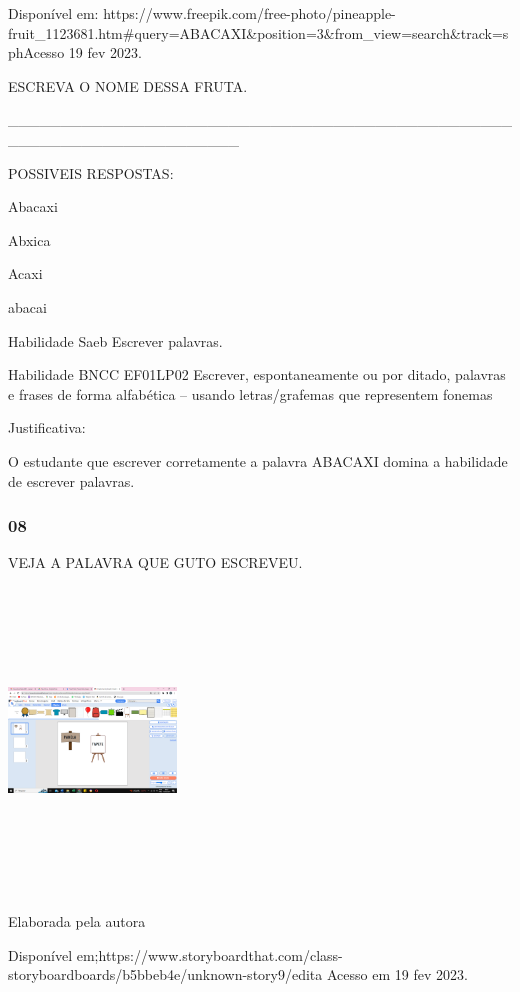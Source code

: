 \begin{escola}
Disponível
em: https://www.freepik.com/free-photo/pineapple-fruit\_1123681.htm\#query=ABACAXI\&position=3\&from\_view=search\&track=sphAcesso
19 fev 2023.

ESCREVA O NOME DESSA FRUTA.

\_\_\_\_\_\_\_\_\_\_\_\_\_\_\_\_\_\_\_\_\_\_\_\_\_\_\_\_\_\_\_\_\_\_\_\_\_\_\_\_\_\_\_\_\_\_\_\_\_\_\_\_\_\_\_\_\_\_\_\_\_\_\_\_\_\_\_\_\_\_

\protect\hypertarget{_heading=h.3fwokq0}{}{}POSSIVEIS RESPOSTAS:

Abacaxi

Abxica

Acaxi

abacai

Habilidade Saeb Escrever palavras.

\protect\hypertarget{_heading=h.1v1yuxt}{}{}Habilidade BNCC EF01LP02
Escrever, espontaneamente ou por ditado, palavras e frases de forma
alfabética -- usando letras/grafemas que representem fonemas

Justificativa:

O estudante que escrever corretamente a palavra ABACAXI domina a
habilidade de escrever palavras.

\subsubsection{08}\label{section-33}

VEJA A PALAVRA QUE GUTO ESCREVEU.

\includegraphics[width=1.76042in,height=3.19514in]{media/image197.png}

Elaborada pela autora

Disponível
em;https://www.storyboardthat.com/class-storyboardboards/b5bbeb4e/unknown-story9/edita
Acesso em 19 fev 2023.


\end{escola}

